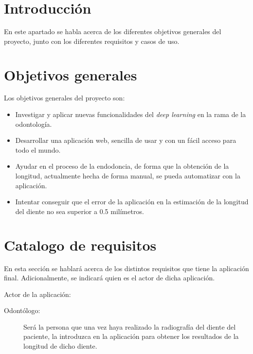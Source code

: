 
\section{Introducción}
En este apartado se habla acerca de los diferentes objetivos generales del proyecto, junto con los diferentes requisitos y casos de uso.

\section{Objetivos generales}
Los objetivos generales del proyecto son:
\begin{itemize}
    \item Investigar y aplicar nuevas funcionalidades del \emph{deep learning} en la rama de la odontología.
    \item Desarrollar una aplicación web, sencilla de usar y con un fácil acceso para todo el mundo.
    \item Ayudar en el proceso de la endodoncia, de forma que la obtención de la longitud, actualmente hecha de forma manual, se pueda automatizar con la aplicación.
    \item Intentar conseguir que el error de la aplicación en la estimación de la longitud del diente no sea superior a 0.5 milímetros.
\end{itemize}

\section{Catalogo de requisitos}
En esta sección se hablará acerca de los distintos requisitos que tiene la aplicación final. Adicionalmente, se indicará quien es el actor de dicha aplicación.

Actor de la aplicación:
\begin{description}
\item[Odontólogo:] Será la persona que una vez haya realizado la radiografía del diente del paciente, la introduzca en la aplicación para obtener los resultados de la longitud de dicho diente.
\end{description}

